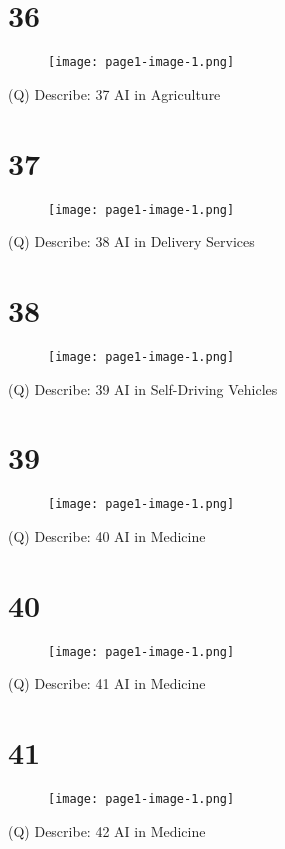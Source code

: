 \documentclass[12pt]{article}
\begin{document}
\section{36}
\begin{figure}[H]
\texttt{[image: page1-image-1.png]}
\end{figure}
\clearpage
(Q)
Describe: 37
\clearpage
AI in Agriculture\\
\section{37}
\begin{figure}[H]
\texttt{[image: page1-image-1.png]}
\end{figure}
\clearpage
(Q)
Describe: 38
\clearpage
AI in Delivery Services\\
\section{38}
\begin{figure}[H]
\texttt{[image: page1-image-1.png]}
\end{figure}
\clearpage
(Q)
Describe: 39
\clearpage
AI in Self-Driving Vehicles\\
\section{39}
\begin{figure}[H]
\texttt{[image: page1-image-1.png]}
\end{figure}
\clearpage
(Q)
Describe: 40
\clearpage
AI in Medicine\\
\section{40}
\begin{figure}[H]
\texttt{[image: page1-image-1.png]}
\end{figure}
\clearpage
(Q)
Describe: 41
\clearpage
AI in Medicine\\
\section{41}
\begin{figure}[H]
\texttt{[image: page1-image-1.png]}
\end{figure}
\clearpage
(Q)
Describe: 42
\clearpage
AI in Medicine\\
\end{document}
